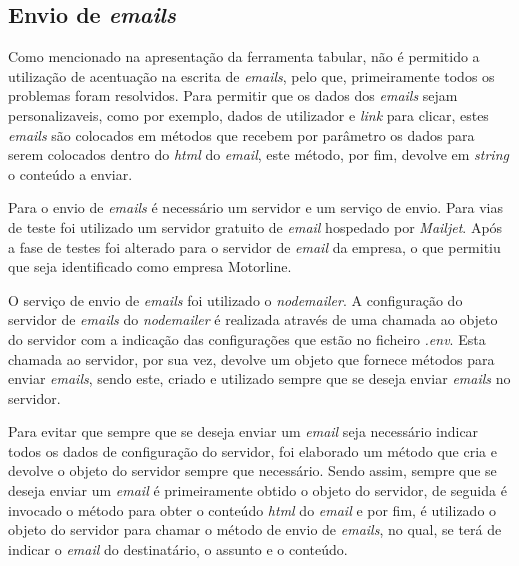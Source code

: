 \subsection{Envio de \textit{emails}}
Como mencionado na apresentação da ferramenta tabular, não é permitido a utilização de acentuação na escrita de \textit{emails}, pelo que, primeiramente todos os problemas foram resolvidos. Para permitir que os dados dos \textit{emails} sejam personalizaveis, como por exemplo, dados de utilizador e \textit{link} para clicar, estes \textit{emails} são colocados em métodos que recebem por parâmetro os dados para serem colocados dentro do \textit{html} do \textit{email}, este método, por fim, devolve em \textit{string} o conteúdo a enviar.

Para o envio de \textit{emails} é necessário um servidor e um serviço de envio. Para vias de teste foi utilizado um servidor gratuito de \textit{email} hospedado por \textit{Mailjet}. Após a fase de testes foi alterado para o servidor de \textit{email} da empresa, o que permitiu que seja identificado como empresa Motorline.

O serviço de envio de \textit{emails} foi utilizado o \textit{nodemailer}. A configuração do servidor de \textit{emails} do \textit{nodemailer} é realizada através de uma chamada ao objeto do servidor com a indicação das configurações que estão no ficheiro \textit{.env}. Esta chamada ao servidor, por sua vez, devolve um objeto que fornece métodos para enviar \textit{emails}, sendo este, criado e utilizado sempre que se deseja enviar \textit{emails} no servidor.

Para evitar que sempre que se deseja enviar um \textit{email} seja necessário indicar todos os dados de configuração do servidor, foi elaborado um método que cria e devolve o objeto do servidor sempre que necessário. Sendo assim, sempre que se deseja enviar um \textit{email} é primeiramente obtido o objeto do servidor, de seguida é invocado o método para obter o conteúdo \textit{html} do \textit{email} e por fim, é utilizado o objeto do servidor para chamar o método de envio de \textit{emails}, no qual, se terá de indicar o \textit{email} do destinatário, o assunto e o conteúdo.
